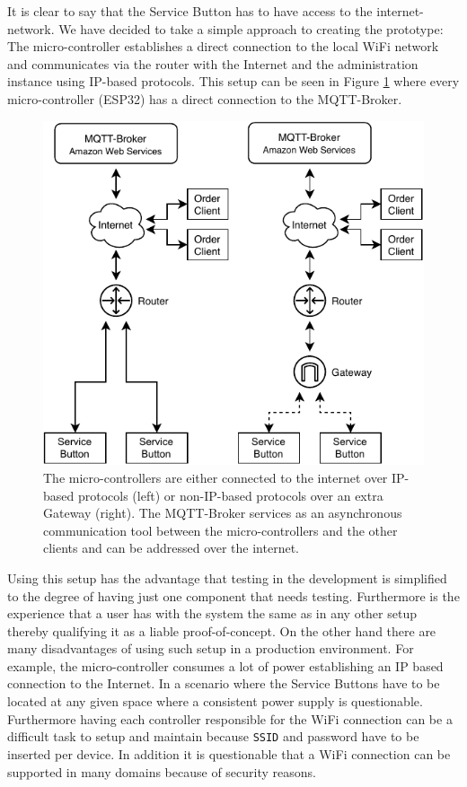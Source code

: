 It is clear to say that the Service Button has to have access to the internet-network. We have decided to take a simple approach to creating the prototype: The micro-controller establishes a direct connection to the local WiFi network and communicates via the router with the Internet and the administration instance using IP-based protocols. This setup can be seen in Figure \ref{fig:architecture} where every micro-controller (ESP32) has a direct connection to the MQTT-Broker.

\begin{figure}
    \center
    \includegraphics[width=\linewidth]{figures/architektur.drawio.pdf}
    
    \caption{The micro-controllers are either connected to the internet over IP-based protocols (left) or non-IP-based protocols over an extra Gateway (right). The MQTT-Broker services as an asynchronous communication tool between the micro-controllers and the other clients and can be addressed over the internet.}
    \label{fig:architecture}
\end{figure}

Using this setup has the advantage that testing in the development is simplified to the degree of having just one component that needs testing. Furthermore is the experience that a user has with the system the same as in any other setup thereby qualifying it as a liable proof-of-concept. On the other hand there are many disadvantages of using such setup in a production environment. For example, the micro-controller consumes a lot of power establishing an IP based connection to the Internet. In a scenario where the Service Buttons have to be located at any given space where a consistent power supply is questionable. Furthermore having each controller responsible for the WiFi connection can be a difficult task to setup and maintain because \texttt{SSID} and password have to be inserted per device. In addition it is questionable that a WiFi connection can be supported in many domains because of security reasons.

